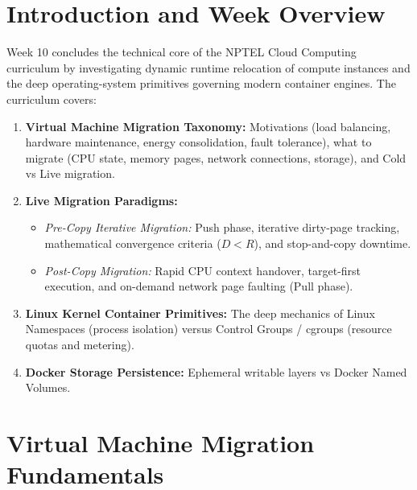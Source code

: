 \documentclass[11pt,a4paper,openany]{report}
\begin{document}
\section{Introduction and Week Overview}
Week 10 concludes the technical core of the NPTEL Cloud Computing curriculum by investigating dynamic runtime relocation of compute instances and the deep operating-system primitives governing modern container engines. The curriculum covers:
\begin{enumerate}[leftmargin=*]
  \item \textbf{Virtual Machine Migration Taxonomy:} Motivations (load balancing, hardware maintenance, energy consolidation, fault tolerance), what to migrate (CPU state, memory pages, network connections, storage), and Cold vs Live migration.
  \item \textbf{Live Migration Paradigms:}
    \begin{itemize}
      \item \emph{Pre-Copy Iterative Migration:} Push phase, iterative dirty-page tracking, mathematical convergence criteria ($D < R$), and stop-and-copy downtime.
      \item \emph{Post-Copy Migration:} Rapid CPU context handover, target-first execution, and on-demand network page faulting (Pull phase).
    \end{itemize}
  \item \textbf{Linux Kernel Container Primitives:} The deep mechanics of Linux Namespaces (process isolation) versus Control Groups / cgroups (resource quotas and metering).
  \item \textbf{Docker Storage Persistence:} Ephemeral writable layers vs Docker Named Volumes.
\end{enumerate}

\section{Virtual Machine Migration Fundamentals}
\end{document}
